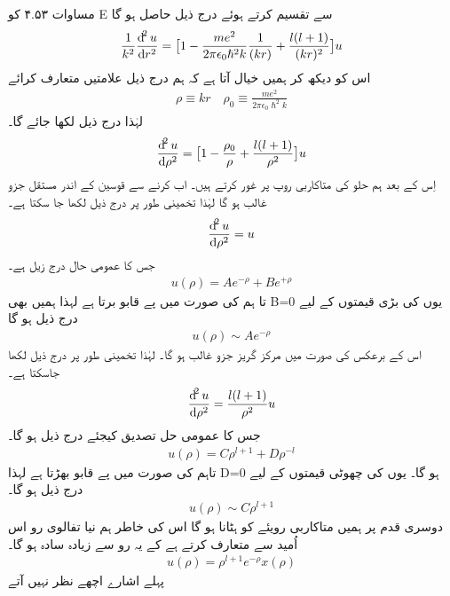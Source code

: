  مساوات ۴.۵۳ کو E سے تقسیم کرتے ہوئے درج ذیل حاصل ہو گا
\begin{align}
\frac{1}{k^{2}}\frac{\dif^{2}{u}}{\dif{r^{2}}}=\big[1-\frac{me^{2}}{2\pi\epsilon_{0}\hslash^{2}k}\frac{1}{(kr)}+\frac{l(l+1)}{(kr)^{2}}\big]u 
\end{align}
اس کو دیکھ کر ہمیں خیال آتا ہے کہ ہم درج ذیل علامتیں متعارف کرائے 
\begin{align}
\rho\equiv kr \quad \rho_{0}\equiv\frac{me^{2}}{2\pi\epsilon_{0}\hslash^{2}k} 
\end{align}
لہٰذا درج ذیل لکھا جائے گا۔
\begin{align}
\frac{\dif^{2}{u}}{\dif{\rho^{2}}}=\big[1-\frac{\rho_{0}}{\rho}+\frac{l(l+1)}{\rho^{2}}\big]u 
\end{align}
اِس کے بعد ہم حلو کی متاکاربی روپ پر غور کرتے ہیں۔ اب
کرنے سے قوسین کے اندر مستقل جزو غالب ہو گا لہٰذا تخمینی طور پر درج ذیل لکھا جا سکتا ہے۔
\begin{align}
\frac{\dif^{2}{u}}{\dif{\rho^{2}}}=u 
\end{align}
جس کا عمومی حال درج زیل ہے۔
\begin{align}
u(\rho)=Ae^{-\rho}+Be^{+\rho} 
\end{align}
تا ہم 
کی صورت میں 
پے قابو برتا ہے لہذا ہمیں بھی
B=0
یوں 
کی بڑی قیمتوں کے لیے درج  ذیل ہو گا 
\begin{align}
u(\rho)\sim Ae^{-\rho} 
\end{align}
اس کے برعکس 
کی صورت میں مرکز گریز جزو غالب ہو گا۔ لہٰذا تخمينی طور پر درج ذیل لکھا جاسکتا ہے۔ 
\begin{align}
\frac{\dif^{2}{u}}{\dif{\rho^{2}}}=\frac{l(l+1)}{\rho^{2}}u 
\end{align}
 جس کا عمومی حل تصدیق کیجئے درج ذیل ہو گا۔
 \begin{align}
u(\rho)=C\rho^{l+1}+D\rho^{-l} 
\end{align}
 تاہم
 کی صورت میں
 پے قابو بھڑتا ہے لہذا
 D=0
 ہو گا۔
 یوں 
 کی چھوٹی قیمتوں کے لیے درج ذیل ہو گا۔
 \begin{align}
u(\rho)\sim C\rho^{l+1} 
\end{align}
  دوسری قدم پر ہمیں متاکاربی رویئے کو ہٹانا ہو گا اس کی خاطر ہم نیا تفالوی رو اس اُمید سے متعارف کرتے ہے کے یہ
    رو سے زیادہ سادہ ہو گا۔
  \begin{align}
u(\rho)=\rho^{l+1}e^{-\rho}x(\rho) 
\end{align}
  پہلے اشارے اچھے نظر نہیں آتے

